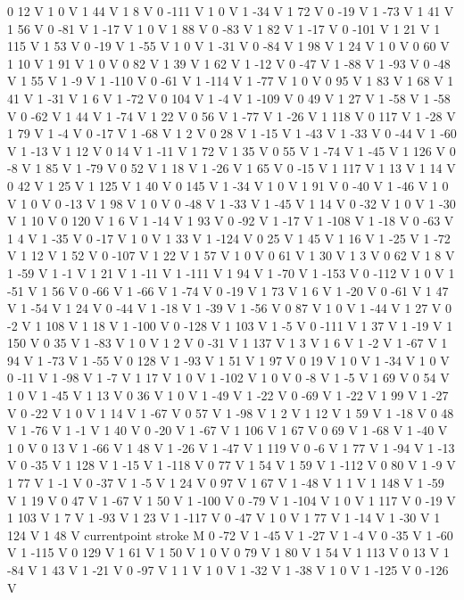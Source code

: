 {{0 12 V
1 0 V
1 44 V
1 8 V
0 -111 V
1 0 V
1 -34 V
1 72 V
0 -19 V
1 -73 V
1 41 V
1 56 V
0 -81 V
1 -17 V
1 0 V
1 88 V
0 -83 V
1 82 V
1 -17 V
0 -101 V
1 21 V
1 115 V
1 53 V
0 -19 V
1 -55 V
1 0 V
1 -31 V
0 -84 V
1 98 V
1 24 V
1 0 V
0 60 V
1 10 V
1 91 V
1 0 V
0 82 V
1 39 V
1 62 V
1 -12 V
0 -47 V
1 -88 V
1 -93 V
0 -48 V
1 55 V
1 -9 V
1 -110 V
0 -61 V
1 -114 V
1 -77 V
1 0 V
0 95 V
1 83 V
1 68 V
1 41 V
1 -31 V
1 6 V
1 -72 V
0 104 V
1 -4 V
1 -109 V
0 49 V
1 27 V
1 -58 V
1 -58 V
0 -62 V
1 44 V
1 -74 V
1 22 V
0 56 V
1 -77 V
1 -26 V
1 118 V
0 117 V
1 -28 V
1 79 V
1 -4 V
0 -17 V
1 -68 V
1 2 V
0 28 V
1 -15 V
1 -43 V
1 -33 V
0 -44 V
1 -60 V
1 -13 V
1 12 V
0 14 V
1 -11 V
1 72 V
1 35 V
0 55 V
1 -74 V
1 -45 V
1 126 V
0 -8 V
1 85 V
1 -79 V
0 52 V
1 18 V
1 -26 V
1 65 V
0 -15 V
1 117 V
1 13 V
1 14 V
0 42 V
1 25 V
1 125 V
1 40 V
0 145 V
1 -34 V
1 0 V
1 91 V
0 -40 V
1 -46 V
1 0 V
1 0 V
0 -13 V
1 98 V
1 0 V
0 -48 V
1 -33 V
1 -45 V
1 14 V
0 -32 V
1 0 V
1 -30 V
1 10 V
0 120 V
1 6 V
1 -14 V
1 93 V
0 -92 V
1 -17 V
1 -108 V
1 -18 V
0 -63 V
1 4 V
1 -35 V
0 -17 V
1 0 V
1 33 V
1 -124 V
0 25 V
1 45 V
1 16 V
1 -25 V
1 -72 V
1 12 V
1 52 V
0 -107 V
1 22 V
1 57 V
1 0 V
0 61 V
1 30 V
1 3 V
0 62 V
1 8 V
1 -59 V
1 -1 V
1 21 V
1 -11 V
1 -111 V
1 94 V
1 -70 V
1 -153 V
0 -112 V
1 0 V
1 -51 V
1 56 V
0 -66 V
1 -66 V
1 -74 V
0 -19 V
1 73 V
1 6 V
1 -20 V
0 -61 V
1 47 V
1 -54 V
1 24 V
0 -44 V
1 -18 V
1 -39 V
1 -56 V
0 87 V
1 0 V
1 -44 V
1 27 V
0 -2 V
1 108 V
1 18 V
1 -100 V
0 -128 V
1 103 V
1 -5 V
0 -111 V
1 37 V
1 -19 V
1 150 V
0 35 V
1 -83 V
1 0 V
1 2 V
0 -31 V
1 137 V
1 3 V
1 6 V
1 -2 V
1 -67 V
1 94 V
1 -73 V
1 -55 V
0 128 V
1 -93 V
1 51 V
1 97 V
0 19 V
1 0 V
1 -34 V
1 0 V
0 -11 V
1 -98 V
1 -7 V
1 17 V
1 0 V
1 -102 V
1 0 V
0 -8 V
1 -5 V
1 69 V
0 54 V
1 0 V
1 -45 V
1 13 V
0 36 V
1 0 V
1 -49 V
1 -22 V
0 -69 V
1 -22 V
1 99 V
1 -27 V
0 -22 V
1 0 V
1 14 V
1 -67 V
0 57 V
1 -98 V
1 2 V
1 12 V
1 59 V
1 -18 V
0 48 V
1 -76 V
1 -1 V
1 40 V
0 -20 V
1 -67 V
1 106 V
1 67 V
0 69 V
1 -68 V
1 -40 V
1 0 V
0 13 V
1 -66 V
1 48 V
1 -26 V
1 -47 V
1 119 V
0 -6 V
1 77 V
1 -94 V
1 -13 V
0 -35 V
1 128 V
1 -15 V
1 -118 V
0 77 V
1 54 V
1 59 V
1 -112 V
0 80 V
1 -9 V
1 77 V
1 -1 V
0 -37 V
1 -5 V
1 24 V
0 97 V
1 67 V
1 -48 V
1 1 V
1 148 V
1 -59 V
1 19 V
0 47 V
1 -67 V
1 50 V
1 -100 V
0 -79 V
1 -104 V
1 0 V
1 117 V
0 -19 V
1 103 V
1 7 V
1 -93 V
1 23 V
1 -117 V
0 -47 V
1 0 V
1 77 V
1 -14 V
1 -30 V
1 124 V
1 48 V
currentpoint stroke M
0 -72 V
1 -45 V
1 -27 V
1 -4 V
0 -35 V
1 -60 V
1 -115 V
0 129 V
1 61 V
1 50 V
1 0 V
0 79 V
1 80 V
1 54 V
1 113 V
0 13 V
1 -84 V
1 43 V
1 -21 V
0 -97 V
1 1 V
1 0 V
1 -32 V
1 -38 V
1 0 V
1 -125 V
0 -126 V
}}
